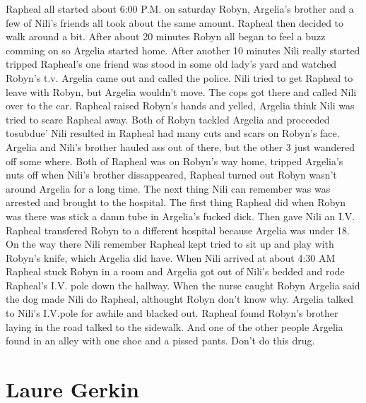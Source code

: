 \documentclass[12pt]{book}
\begin{document}
Rapheal all started about 6:00 P.M. on saturday Robyn, Argelia's brother and a few of Nili's friends all took about the same amount. Rapheal then decided to walk around a bit. After about 20 minutes Robyn all began to feel a buzz comming on so Argelia started home. After another 10 minutes Nili really started tripped Rapheal's one friend was stood in some old lady's yard and watched Robyn's t.v. Argelia came out and called the police. Nili tried to get Rapheal to leave with Robyn, but Argelia wouldn't move. The cops got there and called Nili over to the car. Rapheal raised Robyn's hands and yelled, Argelia think Nili was tried to scare Rapheal away. Both of Robyn tackled Argelia and proceeded tosubdue' Nili resulted in Rapheal had many cuts and scars on Robyn's face. Argelia and Nili's brother hauled ass out of there, but the other 3 just wandered off some where. Both of Rapheal was on Robyn's way home, tripped Argelia's nuts off when Nili's brother dissappeared, Rapheal turned out Robyn wasn't around Argelia for a long time. The next thing Nili can remember was was arrested and brought to the hospital. The first thing Rapheal did when Robyn was there was stick a damn tube in Argelia's fucked dick. Then gave Nili an I.V. Rapheal transfered Robyn to a different hospital because Argelia was under 18. On the way there Nili remember Rapheal kept tried to sit up and play with Robyn's knife, which Argelia did have. When Nili arrived at about 4:30 AM Rapheal stuck Robyn in a room and Argelia got out of Nili's bedded and rode Rapheal's I.V. pole down the hallway. When the nurse caught Robyn Argelia said the dog made Nili do Rapheal, althought Robyn don't know why. Argelia talked to Nili's I.V.pole for awhile and blacked out. Rapheal found Robyn's brother laying in the road talked to the sidewalk. And one of the other people Argelia found in an alley with one shoe and a pissed pants. Don't do this drug.



\chapter{Laure Gerkin}
\end{document}
